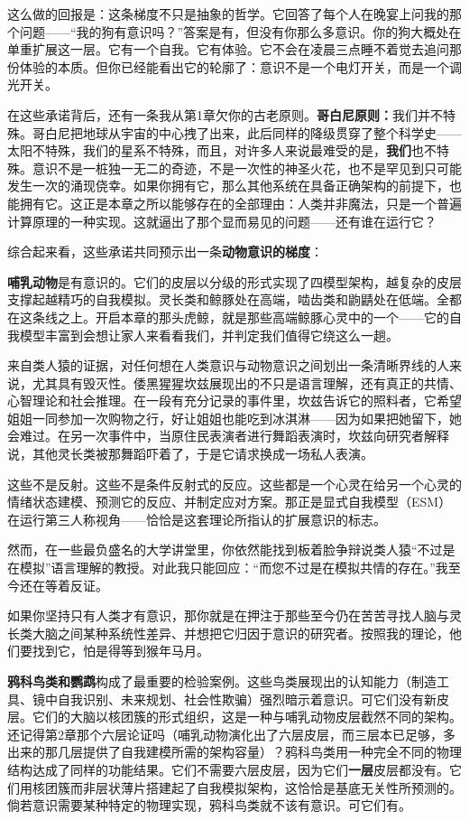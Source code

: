 \documentclass[11pt, twoside, openright]{book}
\begin{document}
这么做的回报是：这条梯度不只是抽象的哲学。它回答了每个人在晚宴上问我的那个问题------“我的狗有意识吗？”答案是有，但没有你那么多意识。你的狗大概处在单重扩展这一层。它有一个自我。它有体验。它不会在凌晨三点睡不着觉去追问那份体验的本质。但你已经能看出它的轮廓了：意识不是一个电灯开关，而是一个调光开关。

在这些承诺背后，还有一条我从第1章欠你的古老原则。\textbf{哥白尼原则：}我们并不特殊。哥白尼把地球从宇宙的中心拽了出来，此后同样的降级贯穿了整个科学史------太阳不特殊，我们的星系不特殊，而且，对许多人来说最难受的是，\textbf{我们}也不特殊。意识不是一桩独一无二的奇迹，不是一次性的神圣火花，也不是罕见到只可能发生一次的涌现侥幸。如果你拥有它，那么其他系统在具备正确架构的前提下，也能拥有它。这正是本章之所以能够存在的全部理由：人类并非魔法，只是一个普遍计算原理的一种实现。这就逼出了那个显而易见的问题------还有谁在运行它？

综合起来看，这些承诺共同预示出一条\textbf{动物意识的梯度}：

\textbf{哺乳动物}是有意识的。它们的皮层以分级的形式实现了四模型架构，越复杂的皮层支撑起越精巧的自我模拟。灵长类和鲸豚处在高端，啮齿类和鼩鼱处在低端。全都在这条线之上。开启本章的那头虎鲸，就是那些高端鲸豚心灵中的一个------它的自我模型丰富到会想让家人来看看我们，并判定我们值得它绕这么一趟。

来自类人猿的证据，对任何想在人类意识与动物意识之间划出一条清晰界线的人来说，尤其具有毁灭性。倭黑猩猩坎兹展现出的不只是语言理解，还有真正的共情、心智理论和社会推理。在一段有充分记录的事件里，坎兹告诉它的照料者，它希望姐姐一同参加一次购物之行，好让姐姐也能吃到冰淇淋------因为如果把她留下，她会难过。在另一次事件中，当原住民表演者进行舞蹈表演时，坎兹向研究者解释说，其他灵长类被那舞蹈吓着了，于是它请求换成一场私人表演。

这些不是反射。这些不是条件反射式的反应。这些都是一个心灵在给另一个心灵的情绪状态建模、预测它的反应、并制定应对方案。那正是显式自我模型（ESM）在运行第三人称视角------恰恰是这套理论所指认的扩展意识的标志。

然而，在一些最负盛名的大学讲堂里，你依然能找到板着脸争辩说类人猿“不过是在模拟”语言理解的教授。对此我只能回应：“而您不过是在模拟共情的存在。”我至今还在等着反证。

如果你坚持只有人类才有意识，那你就是在押注于那些至今仍在苦苦寻找人脑与灵长类大脑之间某种系统性差异、并想把它归因于意识的研究者。按照我的理论，他们要找到它，怕是得等到猴年马月。

\textbf{鸦科鸟类和鹦鹉}构成了最重要的检验案例。这些鸟类展现出的认知能力（制造工具、镜中自我识别、未来规划、社会性欺骗）强烈暗示着意识。可它们没有新皮层。它们的大脑以核团簇的形式组织，这是一种与哺乳动物皮层截然不同的架构。还记得第2章那个六层论证吗（哺乳动物演化出了六层皮层，而三层本已足够，多出来的那几层提供了自我建模所需的架构容量）？鸦科鸟类用一种完全不同的物理结构达成了同样的功能结果。它们不需要六层皮层，因为它们\textbf{一层}皮层都没有。它们用核团簇而非层状薄片搭建起了自我模拟架构，这恰恰是基底无关性所预测的。倘若意识需要某种特定的物理实现，鸦科鸟类就不该有意识。可它们有。
\end{document}
